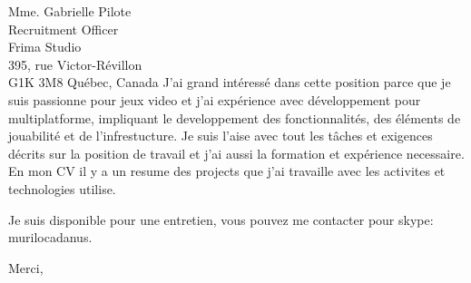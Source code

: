 \documentclass[11pt]{letter} %
\begin{document}
\begin{letter}{Mme. Gabrielle Pilote \\
Recruitment Officer \\
Frima Studio \\
395, rue Victor-Révillon \\
G1K 3M8 Québec, Canada}
J'ai grand intéressé dans cette position parce que je suis passionne pour jeux video et j'ai expérience avec développement pour multiplatforme, impliquant le developpement des fonctionnalités, des éléments de jouabilité et de l'infrestucture. Je suis l'aise avec tout les tâches et exigences décrits sur la position de travail et j'ai aussi la formation et expérience necessaire. En mon CV il y a un resume des projects que j'ai travaille avec les activites et technologies utilise.

Je suis disponible pour une entretien, vous pouvez me contacter pour skype: murilocadanus.

\closing{Merci, }


\end{letter}
\end{document}
